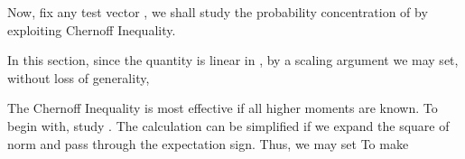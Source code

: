 Now, fix any test vector , we shall study the probability concentration of
by exploiting Chernoff Inequality.

In this section, since the quantity  is linear in , by a scaling argument we may set, without loss of generality,

\stopsubsection

\startsubsection [title={The First Moment}]

The Chernoff Inequality is most effective if all higher moments are known.
To begin with, study .
The calculation can be simplified if we expand the square of norm and pass through the expectation sign.
Thus, we may set
To make

\stopsubsection

\startsubsection [title={The Second Moment}]

